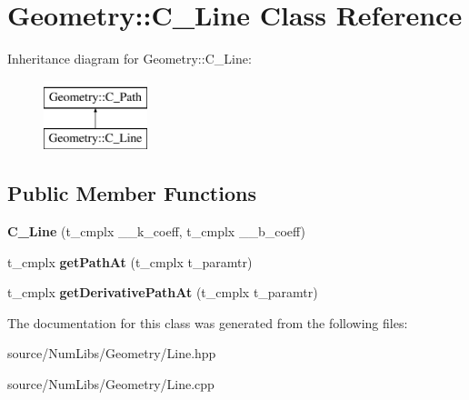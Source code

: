 \hypertarget{class_geometry_1_1_c___line}{\section{Geometry\-:\-:C\-\_\-\-Line Class Reference}
\label{class_geometry_1_1_c___line}
}
Inheritance diagram for Geometry\-:\-:C\-\_\-\-Line\-:\begin{figure}[H]
\begin{center}
\leavevmode
\includegraphics[height=2.000000cm]{class_geometry_1_1_c___line}
\end{center}
\end{figure}
\subsection*{Public Member Functions}
\begin{DoxyCompactItemize}
\item 
\hypertarget{class_geometry_1_1_c___line_a15acedc22ff33f4b92e3aa10d15081ed}{{\bfseries C\-\_\-\-Line} (t\-\_\-cmplx \-\_\-\-\_\-k\-\_\-coeff, t\-\_\-cmplx \-\_\-\-\_\-b\-\_\-coeff)}\label{class_geometry_1_1_c___line_a15acedc22ff33f4b92e3aa10d15081ed}

\item 
\hypertarget{class_geometry_1_1_c___line_a16c50bebf737fc6a12f9605be5c38944}{t\-\_\-cmplx {\bfseries get\-Path\-At} (t\-\_\-cmplx t\-\_\-paramtr)}\label{class_geometry_1_1_c___line_a16c50bebf737fc6a12f9605be5c38944}

\item 
\hypertarget{class_geometry_1_1_c___line_a5d2a8ca944731f6b8d239b9aa52cbfdf}{t\-\_\-cmplx {\bfseries get\-Derivative\-Path\-At} (t\-\_\-cmplx t\-\_\-paramtr)}\label{class_geometry_1_1_c___line_a5d2a8ca944731f6b8d239b9aa52cbfdf}

\end{DoxyCompactItemize}


The documentation for this class was generated from the following files\-:\begin{DoxyCompactItemize}
\item 
source/\-Num\-Libs/\-Geometry/Line.\-hpp\item 
source/\-Num\-Libs/\-Geometry/Line.\-cpp\end{DoxyCompactItemize}
